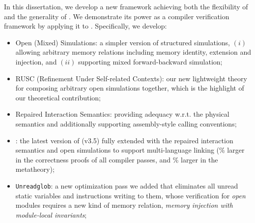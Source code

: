 %
In this dissertation, we develop a new framework achieving both the
flexibility of \ccx{} and the generality of \ccc{}.  We demonstrate
its power as a compiler verification framework by applying it to \cc{}.
Specifically, we develop:
\begin{itemize}
\item Open (Mixed) Simulations: a simpler version of structured simulations,
  $(i)$ allowing arbitrary memory relations including memory identity, extension and injection,
  and $(ii)$ supporting mixed forward-backward simulation;
\item RUSC (Refinement Under Self-related Contexts): our new
  lightweight theory for composing arbitrary open simulations
  together, which is the highlight of our theoretical contribution;
\item Repaired Interaction Semantics: providing adequacy w.r.t. the
  physical semantics and additionally supporting assembly-style
  calling conventions;
\item \ccm{}: the latest version of \cc{} (v3.5) fully extended with
  the repaired interaction semantics and open simulations to support
  multi-language linking (\% larger in the correctness
  proofs of all compiler passes, and \% larger in the metatheory);
\item \texttt{Unreadglob}:
  a new optimization pass we added that eliminates all unread static
  variables and instructions writing to them,
  whose verification for \emph{open} modules requires
  a new kind of memory relation, \emph{memory injection with module-local
  invariants};
\end{itemize}
\medskip

